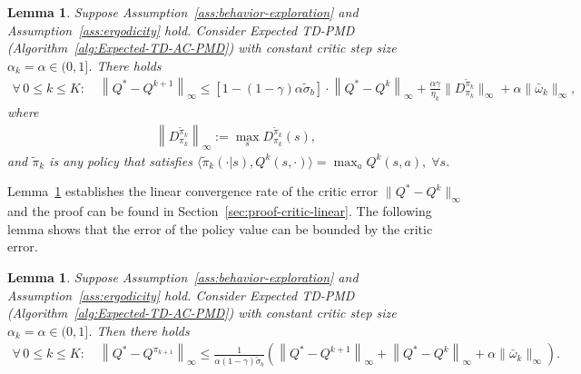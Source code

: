 \documentclass[10pt]{article}
\newcommand{\ls}{\left}
\newcommand{\rs}{\right}
\theoremstyle{plain}
\newtheorem{lemma}[theorem]{Lemma}
\theoremstyle{definition}
\begin{document}
\begin{lemma}
    Suppose Assumption~\ref{ass:behavior-exploration} and Assumption~\ref{ass:ergodicity} hold. Consider Expected TD-PMD (Algorithm~\ref{alg:Expected-TD-AC-PMD}) with constant critic step size $\alpha_k = \alpha \in (0,1]$. There holds
    \begin{align*}
        \forall\, 0\leq k \leq K: \quad \ls\| Q^* - Q^{k+1} \rs\|_\infty \leq [1-(1-\gamma)\alpha\tilde\sigma_b] \cdot \ls\| Q^* - Q^k \rs\|_\infty + \frac{\alpha\gamma}{\eta_k} \| D^{\tilde\pi_k}_{\pi_k} \|_\infty + \alpha \| \bar\omega_k \|_\infty,
    \end{align*}
    where 
    \begin{align*}
        \ls\|D_{\pi_k}^{\tilde{\pi}_k} \rs\|_\infty :=\max_s D_{\pi_k}^{\tilde{\pi}_k}(s),
    \end{align*}
    and $\tilde{\pi}_k$ is any policy that satisfies $\langle\tilde{\pi}_k(\cdot|s),Q^k(s,\cdot)\rangle = \max_aQ^{k}(s,a),\;\forall s$.
    \label{lem:Expected-TD-AC-PMD:linear-critic-convergence}
\end{lemma}



Lemma~\ref{lem:Expected-TD-AC-PMD:linear-critic-convergence} establishes  the linear convergence rate of the critic error $\| Q^* - Q^k \|_\infty$ and the proof can be found in Section~\ref{sec:proof-critic-linear}. The following lemma shows that the error of the policy value can be bounded by the critic error.

\begin{lemma}
    Suppose Assumption~\ref{ass:behavior-exploration} and Assumption~\ref{ass:ergodicity} hold. Consider Expected TD-PMD \textup{(}Algorithm~\ref{alg:Expected-TD-AC-PMD}\textup{)} with constant critic step size $\alpha_k = \alpha \in (0,1]$. Then there holds
    \begin{align*}
        \forall\, 0 \leq k \leq K: \quad \ls\| Q^* - Q^{\pi_{k+1}} \rs\|_\infty \leq \frac{1}{\alpha(1-\gamma)\tilde\sigma_b} \ls( \ls\| Q^* - Q^{k+1} \rs\|_\infty + \ls\| Q^* - Q^k \rs\|_\infty + \alpha \| \bar\omega_k \|_\infty \rs).
    \end{align*}
    \label{lem:Expected-TD-AC-PMD:linear-actor-convergence}
\end{lemma}
\end{document}
